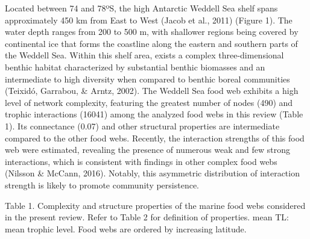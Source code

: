 \documentclass[
]{article}
\begin{document}
Located between 74 and 78ºS, the high Antarctic Weddell Sea shelf spans
approximately 450 km from East to West (Jacob et al., 2011) (Figure 1).
The water depth ranges from 200 to 500 m, with shallower regions being
covered by continental ice that forms the coastline along the eastern
and southern parts of the Weddell Sea. Within this shelf area, exists a
complex three-dimensional benthic habitat characterized by substantial
benthic biomasses and an intermediate to high diversity when compared to
benthic boreal communities (Teixidó, Garrabou, \& Arntz, 2002). The
Weddell Sea food web exhibits a high level of network complexity,
featuring the greatest number of nodes (490) and trophic interactions
(16041) among the analyzed food webs in this review (Table 1). Its
connectance (0.07) and other structural properties are intermediate
compared to the other food webs. Recently, the interaction strengths of
this food web were estimated, revealing the presence of numerous weak
and few strong interactions, which is consistent with findings in other
complex food webs (Nilsson \& McCann, 2016). Notably, this asymmetric
distribution of interaction strength is likely to promote community
persistence.

\newpage
\footnotesize

Table 1. Complexity and structure properties of the marine food webs
considered in the present review. Refer to Table 2 for definition of
properties. mean TL: mean trophic level. Food webs are ordered by
increasing latitude.
\end{document}
